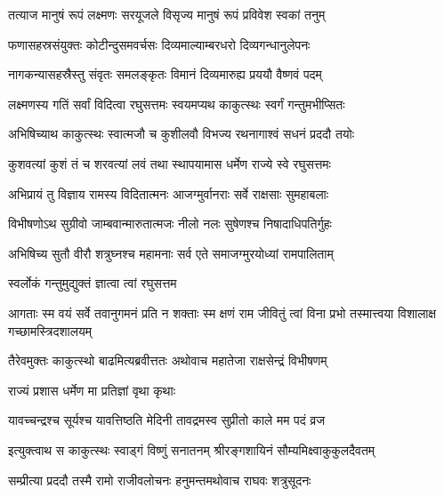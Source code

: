 \twolineshloka
{तत्याज मानुषं रूपं लक्ष्मणः सरयूजले}
{विसृज्य मानुषं रूपं प्रविवेश स्वकां तनुम्}%

\twolineshloka
{फणासहस्रसंयुक्तः कोटीन्दुसमवर्चसः}
{दिव्यमाल्याम्बरधरो दिव्यगन्धानुलेपनः}%

\twolineshloka
{नागकन्यासहस्रैस्तु संवृतः समलङ्कृतः}
{विमानं दिव्यमारुह्य प्रययौ वैष्णवं पदम्}%

\twolineshloka
{लक्ष्मणस्य गतिं सर्वां विदित्वा रघुसत्तमः}
{स्वयमप्यथ काकुत्स्थः स्वर्गं गन्तुमभीप्सितः}%

\twolineshloka
{अभिषिच्याथ काकुत्स्थः स्वात्मजौ च कुशीलवौ}
{विभज्य रथनागाश्वं सधनं प्रददौ तयोः}%

\twolineshloka
{कुशवत्यां कुशं तं च शरवत्यां लवं तथा}
{स्थापयामास धर्मेण राज्ये स्वे रघुसत्तमः}%

\twolineshloka
{अभिप्रायं तु विज्ञाय रामस्य विदितात्मनः}
{आजग्मुर्वानराः सर्वे राक्षसाः सुमहाबलाः}%

\twolineshloka
{विभीषणोऽथ सुग्रीवो जाम्बवान्मारुतात्मजः}
{नीलो नलः सुषेणश्च निषादाधिपतिर्गुहः}%

\twolineshloka
{अभिषिच्य सुतौ वीरौ शत्रुघ्नश्च महामनाः}
{सर्व एते समाजग्मुरयोध्यां रामपालिताम्}%



\onelineshloka
{स्वर्लोकं गन्तुमुद्युक्तं ज्ञात्वा त्वां रघुसत्तम}%


\threelineshloka
{आगताः स्म वयं सर्वे तवानुगमनं प्रति}
{न शक्ताः स्म क्षणं राम जीवितुं त्वां विना प्रभो}
{तस्मात्त्वया विशालाक्ष गच्छामस्त्रिदशालयम्}%


\twolineshloka
{तैरेवमुक्तः काकुत्स्थो बाढमित्यब्रवीत्ततः}
{अथोवाच महातेजा राक्षसेन्द्रं विभीषणम्}%


राज्यं प्रशास धर्मेण मा प्रतिज्ञां वृथा कृथाः

\twolineshloka
{यावच्चन्द्रश्च सूर्यश्च यावत्तिष्ठति मेदिनी}
{तावद्रमस्व सुप्रीतो काले मम पदं व्रज}%


\twolineshloka
{इत्युक्त्वाथ स काकुत्स्थः स्वाड्गं विष्णुं सनातनम्}
{श्रीरङ्गशायिनं सौम्यमिक्ष्वाकुकुलदैवतम्}%

\twolineshloka
{सम्प्रीत्या प्रददौ तस्मै रामो राजीवलोचनः}
{हनुमन्तमथोवाच राघवः शत्रुसूदनः}%

